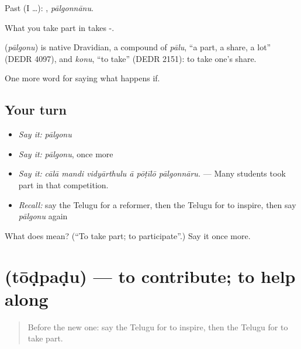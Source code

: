 Past (I …): , \emph{pālgonnānu}.

What you take part in takes -.

\begin{cousinweb}
\textbf{} (\emph{pālgonu}) is native Dravidian, a compound of \emph{pālu}, \textquotedblleft{}a part, a share, a lot\textquotedblright{} (DEDR 4097), and \emph{konu}, \textquotedblleft{}to take\textquotedblright{} (DEDR 2151): to take one’s share.
\end{cousinweb}

\begin{grammarlens}[title={What you've built}]
One more word for saying what happens if.
\end{grammarlens}

\subsection*{Your turn}
\begin{itemize}
\raggedright
  \item \emph{Say it:} \emph{pālgonu}
  \item \emph{Say it:} \emph{pālgonu}, once more
  \item \emph{Say it:} \emph{cālā mandi vidyārthulu ā pōṭīlō pālgonnāru.} — Many students took part in that competition.
  \item \emph{Recall:} say the Telugu for a reformer, then the Telugu for to inspire, then say \emph{pālgonu} again
\end{itemize}

\begin{tcolorbox}[breakable,colback=teal!4,colframe=teal!35!black,title={Before you move on}]
What does  mean? (\textquotedblleft{}To take part; to participate\textquotedblright{}.) Say it once more.
\end{tcolorbox}
\section[\texorpdfstring{\te{తోడ్పడు} (tōḍpaḍu)}{తోడ్పడు (tōḍpaḍu)}]{ (tōḍpaḍu) — to contribute; to help along}

\label{lesson:TE-C436-todpadu}



\begin{quote}
Before the new one: say the Telugu for to inspire, then the Telugu for to take part.
\end{quote}

